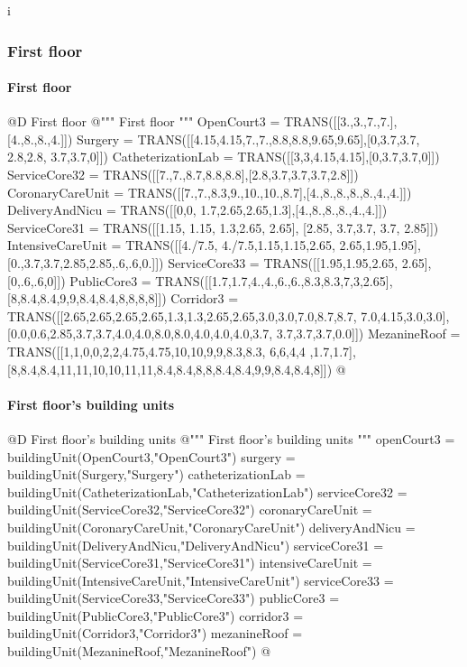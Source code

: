 i\documentclass[11pt,oneside]{article}    %
\begin{document}
\subsubsection{First floor}
\paragraph{First floor}
@D First floor
@{""" First floor """
OpenCourt3 = TRANS([[3.,3.,7.,7.],[4.,8.,8.,4.]])
Surgery = TRANS([[4.15,4.15,7.,7.,8.8,8.8,9.65,9.65],[0,3.7,3.7, 2.8,2.8, 3.7,3.7,0]])
CatheterizationLab = TRANS([[3,3,4.15,4.15],[0,3.7,3.7,0]])
ServiceCore32 = TRANS([[7.,7.,8.7,8.8,8.8],[2.8,3.7,3.7,3.7,2.8]])
CoronaryCareUnit = TRANS([[7.,7.,8.3,9.,10.,10.,8.7],[4.,8.,8.,8.,8.,4.,4.]])
DeliveryAndNicu = TRANS([[0,0, 1.7,2.65,2.65,1.3],[4.,8.,8.,8.,4.,4.]])
ServiceCore31 = TRANS([[1.15, 1.15, 1.3,2.65, 2.65], [2.85, 3.7,3.7, 3.7, 2.85]])
IntensiveCareUnit = TRANS([[4./7.5, 4./7.5,1.15,1.15,2.65, 2.65,1.95,1.95],
    [0.,3.7,3.7,2.85,2.85,.6,.6,0.]])
ServiceCore33 = TRANS([[1.95,1.95,2.65, 2.65],[0,.6,.6,0]])
PublicCore3 = TRANS([[1.7,1.7,4.,4.,6.,6.,8.3,8.3,7,3,2.65],
    [8,8.4,8.4,9,9,8.4,8.4,8,8,8,8]])
Corridor3 = TRANS([[2.65,2.65,2.65,2.65,1.3,1.3,2.65,2.65,3.0,3.0,7.0,8.7,8.7,
    7.0,4.15,3.0,3.0],[0.0,0.6,2.85,3.7,3.7,4.0,4.0,8.0,8.0,4.0,4.0,4.0,3.7,
    3.7,3.7,3.7,0.0]])
MezanineRoof = TRANS([[1,1,0,0,2,2,4.75,4.75,10,10,9,9,8.3,8.3, 6,6,4,4 ,1.7,1.7],
    [8,8.4,8.4,11,11,10,10,11,11,8.4,8.4,8,8,8.4,8.4,9,9,8.4,8.4,8]])
@}

\paragraph{First floor's building units}
@D First floor's building units 
@{""" First floor's building units """
openCourt3 = buildingUnit(OpenCourt3,"OpenCourt3")
surgery = buildingUnit(Surgery,"Surgery")
catheterizationLab = buildingUnit(CatheterizationLab,"CatheterizationLab")
serviceCore32 = buildingUnit(ServiceCore32,"ServiceCore32")
coronaryCareUnit = buildingUnit(CoronaryCareUnit,"CoronaryCareUnit")
deliveryAndNicu = buildingUnit(DeliveryAndNicu,"DeliveryAndNicu")
serviceCore31 = buildingUnit(ServiceCore31,"ServiceCore31")
intensiveCareUnit = buildingUnit(IntensiveCareUnit,"IntensiveCareUnit")
serviceCore33 = buildingUnit(ServiceCore33,"ServiceCore33")
publicCore3 = buildingUnit(PublicCore3,"PublicCore3")
corridor3 = buildingUnit(Corridor3,"Corridor3")
mezanineRoof = buildingUnit(MezanineRoof,"MezanineRoof")
@}
\end{document}

